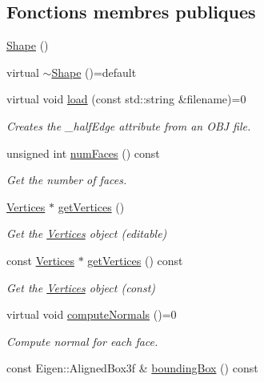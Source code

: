 \subsection*{Fonctions membres publiques}
\begin{DoxyCompactItemize}
\item 
\hyperlink{class_shape_aaa8d87171e65e0d8ba3c5459978992a7}{Shape} ()
\item 
virtual \hyperlink{class_shape_ac8ad2fd02e1e94beeb98e65ab795cd56}{$\sim$\+Shape} ()=default
\item 
virtual void \hyperlink{class_shape_a20d654ec232b682c36cd8b28d2cba750}{load} (const std\+::string \&filename)=0
\begin{DoxyCompactList}\small\item\em Creates the \+\_\+half\+Edge attribute from an O\+BJ file. \end{DoxyCompactList}\item 
unsigned int \hyperlink{class_shape_a13b8454d5ba906f0c99da162d7c14eab}{num\+Faces} () const
\begin{DoxyCompactList}\small\item\em Get the number of faces. \end{DoxyCompactList}\item 
\hyperlink{struct_shape_1_1_vertices}{Vertices} $\ast$ \hyperlink{class_shape_aacdf84a7934b19a50bf9d5b4cd122caf}{get\+Vertices} ()
\begin{DoxyCompactList}\small\item\em Get the \hyperlink{struct_shape_1_1_vertices}{Vertices} object (editable) \end{DoxyCompactList}\item 
const \hyperlink{struct_shape_1_1_vertices}{Vertices} $\ast$ \hyperlink{class_shape_ac40943613d4b7480d305d807abeb01e0}{get\+Vertices} () const
\begin{DoxyCompactList}\small\item\em Get the \hyperlink{struct_shape_1_1_vertices}{Vertices} object (const) \end{DoxyCompactList}\item 
virtual void \hyperlink{class_shape_afd886ad433d08a566003073bfd837f40}{compute\+Normals} ()=0
\begin{DoxyCompactList}\small\item\em Compute normal for each face. \end{DoxyCompactList}\item 
const Eigen\+::\+Aligned\+Box3f \& \hyperlink{class_shape_acd24561b01d6769b4a0c96cd0237a961}{bounding\+Box} () const

\end{DoxyCompactItemize}
